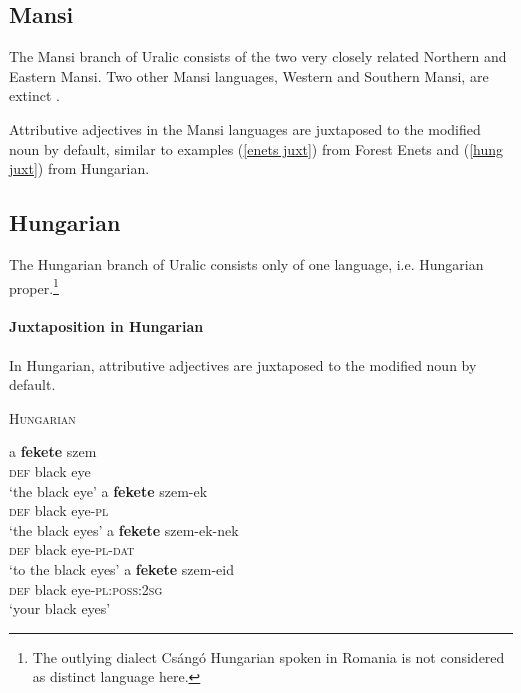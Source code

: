 \subsection{Mansi}
The Mansi branch of Uralic consists of the two very closely related Northern and Eastern Mansi. Two other Mansi languages, Western and Southern Mansi, are extinct \citep[231]{salminen2007}.

Attributive adjectives in the Mansi languages are juxtaposed to the modified noun by default, similar to examples (\ref{enets juxt}) from Forest Enets and (\ref{hung juxt}) from Hungarian.

\subsection{Hungarian}
The Hungarian branch of Uralic consists only of one language, i.e. Hungarian proper.\footnote{The outlying dialect Csángó Hungarian spoken in Romania is not considered as distinct language here.}

\paragraph{Juxtaposition in Hungarian}
In Hungarian, attributive adjectives are juxtaposed to the modified noun by default.
\begin{exe}
\ex \textsc{Hungarian} \citep[41]{hall1938} \label{hung juxt}
\begin{xlist}
\ex 
\gll	a \textbf{fekete} szem\\
	\textsc{def} black eye\\
\glt	‘the black eye’
\ex	
\gll	a \textbf{fekete} szem-ek\\
	\textsc{def} black eye-\textsc{pl}\\
\glt	‘the black eyes’
\ex
\gll	a \textbf{fekete} szem-ek-nek\\
	\textsc{def} black eye-\textsc{pl}-\textsc{dat}\\
\glt	‘to the black eyes’
\ex
\gll	a \textbf{fekete} szem-eid\\
	\textsc{def} black eye-\textsc{pl:poss:2sg}\\
\glt	‘your black eyes’
\end{xlist}
\end{exe}

